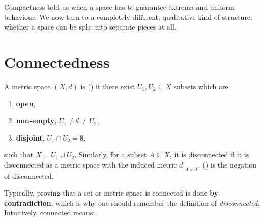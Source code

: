 Compactness told us when a space has  to guarantee extrema and uniform
behaviour. We now turn to a completely different, qualitative kind of structure: whether a space
can be split into separate pieces at all.

\section{Connectedness}
\label{sec:connectedness}

\begin{definition}
\label{def:connectedness}
A metric space $(X,d)$ is  () if there
exist $U_1, U_2 \subseteq X$ subsets which are
\begin{enumerate}[label=\textbf{(\alph*)}]
  \item \textbf{open},
  \item \textbf{non-empty}, $U_1 \neq \emptyset \neq U_2$,
  \item \textbf{disjoint}, $U_1 \cap U_2 = \emptyset$,
\end{enumerate}
such that $X = U_1 \cup U_2$. Similarly, for a subset $A \subseteq X$, it is disconnected if it is
disconnected as a metric space with the induced metric $d|_{A \times A}$. 
() is the negation of disconnected.
\end{definition}

Typically, proving that a set or metric space is connected is done \textbf{by contradiction},
which is why one should remember the definition of \textit{disconnected}. Intuitively, connected
means: 

